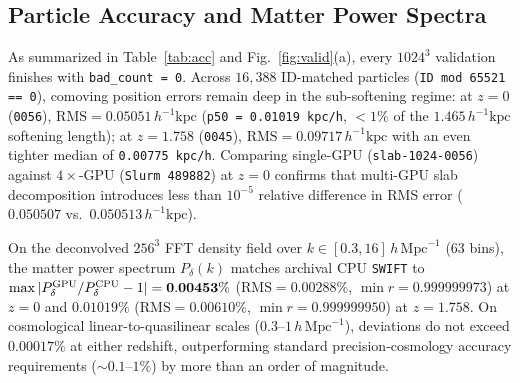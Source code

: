 \documentclass[aps,prd,reprint,superscriptaddress,nofootinbib,amsmath,amssymb,floatfix,longbibliography]{revtex4-2}
\begin{document}
\subsection{Particle Accuracy and Matter Power Spectra}

As summarized in Table~\ref{tab:acc} and Fig.~\ref{fig:valid}(a), every $1024^3$ validation finishes with \texttt{bad\_count = 0}. Across $16{,}388$ ID-matched particles (\texttt{ID mod 65521 == 0}), comoving position errors remain deep in the sub-softening regime: at $z=0$ (\texttt{0056}), $\mathrm{RMS} = 0.05051\,h^{-1}\mathrm{kpc}$ (\texttt{p50 = 0.01019 kpc/h}, $< 1\%$ of the $1.465\,h^{-1}\mathrm{kpc}$ softening length); at $z = 1.758$ (\texttt{0045}), $\mathrm{RMS} = 0.09717\,h^{-1}\mathrm{kpc}$ with an even tighter median of \texttt{0.00775 kpc/h}. Comparing single-GPU (\texttt{slab-1024-0056}) against $4\times$-GPU (\texttt{Slurm 489882}) at $z=0$ confirms that multi-GPU slab decomposition introduces less than $10^{-5}$ relative difference in RMS error ($0.050507$ vs.\ $0.050513\,h^{-1}\mathrm{kpc}$).

On the deconvolved $256^3$ FFT density field over $k \in [0.3, 16]\,h\,\mathrm{Mpc}^{-1}$ ($63$ bins), the matter power spectrum $P_\delta(k)$ matches archival CPU \texttt{SWIFT} to $\max|P_\delta^{\rm GPU}/P_\delta^{\rm CPU} - 1| = \mathbf{0.00453\%}$ ($\mathrm{RMS} = 0.00288\%$, $\min r = 0.999999973$) at $z=0$ and $\mathbf{0.01019\%}$ ($\mathrm{RMS} = 0.00610\%$, $\min r = 0.999999950$) at $z = 1.758$. On cosmological linear-to-quasilinear scales ($0.3\text{--}1\,h\,\mathrm{Mpc}^{-1}$), deviations do not exceed $0.00017\%$ at either redshift, outperforming standard precision-cosmology accuracy requirements ($\sim 0.1\text{--}1\%$) by more than an order of magnitude.
\end{document}
